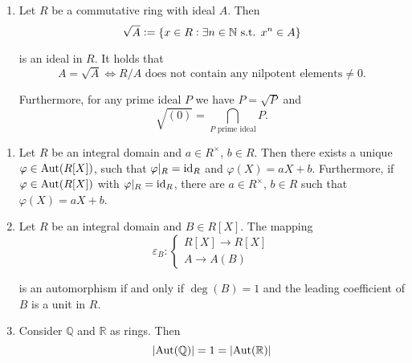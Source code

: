 \begin{example}[Rings]
\begin{enumerate}[label = \textup{(}\alph*\textup{)}]
	\item Let $R$ be a commutative ring with ideal $A$. Then 
		\begin{equation}
			\sqrt{A} := \cbr[0]{x \in R : \exists n \in \mathbb{N} \text{ s.t. } x^n \in A} 
		\end{equation}

		\noindent is an ideal in $R$. It holds that 
		\begin{equation}
			A = \sqrt{A} \Leftrightarrow R/A \text{ does not contain any nilpotent elements} \neq 0.
		\end{equation}

		Furthermore, for any prime ideal $P$ we have $P = \sqrt{P}$ and 
		\begin{equation}
			\sqrt{(0)} = \bigcap_{P \text{ prime ideal}} P.
		\end{equation}
	\end{enumerate}	
\end{example}

\begin{example}
	\mbox{}
	\begin{enumerate}[label = \textup{(}\alph*\textup{)}]
		\item Let $R$ be an integral domain and $a \in R^\times$, $b \in R$. Then there exists a unique $\varphi \in \operatorname{Aut}(R[X])$, such that $\varphi |_R = \operatorname{id}_R$ and $\varphi(X) = aX + b$. Furthermore, if $\varphi \in \operatorname{Aut}(R[X])$ with $\varphi|_R = \operatorname{id}_R$, there are $a \in R^\times$, $b \in R$ such that $\varphi(X) = aX + b$.
		\item Let $R$ be an integral domain and $B \in R[X]$. The mapping
			\begin{equation}
				\varepsilon_B:\begin{cases}
					R[X] \to R[X]\\
					A \to A(B)
				\end{cases}
			\end{equation}

			\noindent is an automorphism if and only if $\deg(B) = 1$ and the leading coefficient of $B$ is a unit in $R$.
		\item Consider $\mathbb{Q}$ and $\mathbb{R}$ as rings. Then 
	\begin{equation}
		\abs[0]{\Aut(\mathbb{Q})} = 1 = \abs[0]{\Aut(\mathbb{R})}
	\end{equation}
\end{enumerate}
\end{example}

